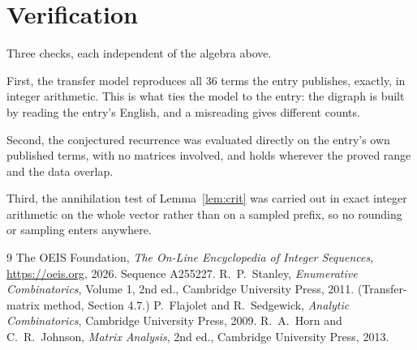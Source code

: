 \documentclass[11pt,a4paper]{article}
\theoremstyle{plain}
\theoremstyle{definition}
\begin{document}
\section{Verification}

Three checks, each independent of the algebra above.

First, the transfer model reproduces all $36$ terms the entry publishes, exactly, in
integer arithmetic. This is what ties the model to the entry: the digraph is built by reading
the entry's English, and a misreading gives different counts.

Second, the conjectured recurrence was evaluated directly on the entry's own published terms,
with no matrices involved, and holds wherever the proved range and the data overlap.

Third, the annihilation test of Lemma~\ref{lem:crit} was carried out in exact integer
arithmetic on the whole vector rather than on a sampled prefix, so no rounding or sampling
enters anywhere.

\begin{thebibliography}{9}
 The OEIS Foundation, \emph{The On-Line Encyclopedia of Integer
Sequences}, \url{https://oeis.org}, 2026. Sequence A255227.
 R.~P.~Stanley, \emph{Enumerative Combinatorics}, Volume 1, 2nd ed.,
Cambridge University Press, 2011. (Transfer-matrix method, Section 4.7.)
 P.~Flajolet and R.~Sedgewick, \emph{Analytic Combinatorics}, Cambridge
University Press, 2009.
 R.~A.~Horn and C.~R.~Johnson, \emph{Matrix Analysis}, 2nd ed., Cambridge
University Press, 2013.
\end{thebibliography}
\end{document}
